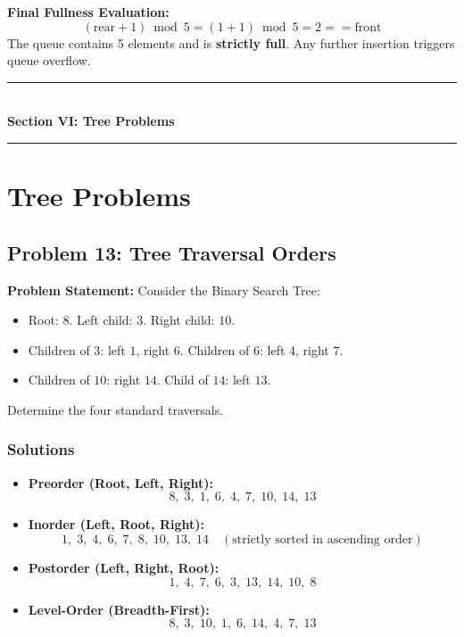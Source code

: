 \textbf{Final Fullness Evaluation:}
\[
(\text{rear} + 1) \bmod 5 = (1 + 1) \bmod 5 = 2 == \text{front}
\]
The queue contains 5 elements and is \textbf{strictly full}. Any further insertion triggers queue overflow.

\newpage
\begin{center}
\vspace{0.5em}
{\color{primary}\rule{0.45\textwidth}{1.2pt}}\\[4pt]
{\Large\bfseries\color{primary} Section VI: Tree Problems}\\[2pt]
{\color{primary}\rule{0.45\textwidth}{1.2pt}}
\vspace{0.5em}
\end{center}

\section{Tree Problems}

\subsection{Problem 13: Tree Traversal Orders}

\textbf{Problem Statement:} Consider the Binary Search Tree:
\begin{itemize}
    \item Root: $8$. Left child: $3$. Right child: $10$.
    \item Children of $3$: left $1$, right $6$. Children of $6$: left $4$, right $7$.
    \item Children of $10$: right $14$. Child of $14$: left $13$.
\end{itemize}
Determine the four standard traversals.

\subsubsection*{Solutions}
\begin{itemize}
    \item \textbf{Preorder (Root, Left, Right):}
    \[
    8, \; 3, \; 1, \; 6, \; 4, \; 7, \; 10, \; 14, \; 13
    \]
    \item \textbf{Inorder (Left, Root, Right):}
    \[
    \boxed{1, \; 3, \; 4, \; 6, \; 7, \; 8, \; 10, \; 13, \; 14} \quad (\text{strictly sorted in ascending order})
    \]
    \item \textbf{Postorder (Left, Right, Root):}
    \[
    1, \; 4, \; 7, \; 6, \; 3, \; 13, \; 14, \; 10, \; 8
    \]
    \item \textbf{Level-Order (Breadth-First):}
    \[
    8, \; 3, \; 10, \; 1, \; 6, \; 14, \; 4, \; 7, \; 13
    \]
\end{itemize}


